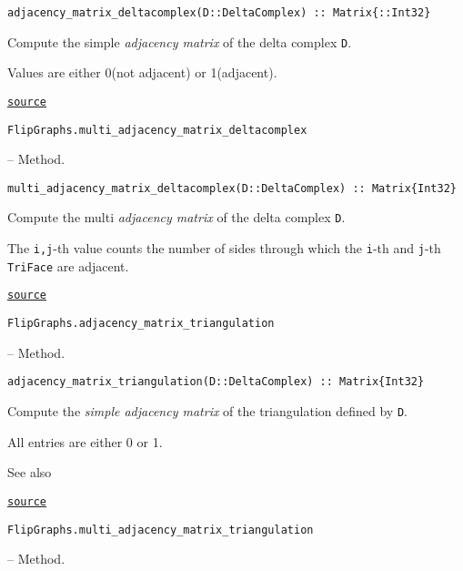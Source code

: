 \begin{adjustwidth}{2em}{0pt}


\begin{verbatim}
adjacency_matrix_deltacomplex(D::DeltaComplex) :: Matrix{::Int32}
\end{verbatim}

Compute the simple \emph{adjacency matrix} of the delta complex \texttt{D}.

Values are either 0(not adjacent) or 1(adjacent).



\href{https://github.com/schto223/FlipGraphs.jl/blob/e35d43698a06b86273148826b79d585ba04fcd26/src/deltaComplex.jl#L407-L413}{\texttt{source}}


\end{adjustwidth}
\hypertarget{3047080931709895726}{\texttt{FlipGraphs.multi\_adjacency\_matrix\_deltacomplex}}  -- {Method.}

\begin{adjustwidth}{2em}{0pt}


\begin{verbatim}
multi_adjacency_matrix_deltacomplex(D::DeltaComplex) :: Matrix{Int32}
\end{verbatim}

Compute the multi \emph{adjacency matrix} of the delta complex \texttt{D}.

The \texttt{i,j}-th value counts the number of sides through which the \texttt{i}-th and \texttt{j}-th \texttt{TriFace} are adjacent.



\href{https://github.com/schto223/FlipGraphs.jl/blob/e35d43698a06b86273148826b79d585ba04fcd26/src/deltaComplex.jl#L432-L438}{\texttt{source}}


\end{adjustwidth}
\hypertarget{10856297191220049265}{\texttt{FlipGraphs.adjacency\_matrix\_triangulation}}  -- {Method.}

\begin{adjustwidth}{2em}{0pt}


\begin{verbatim}
adjacency_matrix_triangulation(D::DeltaComplex) :: Matrix{Int32}
\end{verbatim}

Compute the \emph{simple adjacency matrix} of the triangulation defined by \texttt{D}.

All entries are either 0 or 1.

See also 



\href{https://github.com/schto223/FlipGraphs.jl/blob/e35d43698a06b86273148826b79d585ba04fcd26/src/deltaComplex.jl#L445-L453}{\texttt{source}}


\end{adjustwidth}
\hypertarget{9319800104016369462}{\texttt{FlipGraphs.multi\_adjacency\_matrix\_triangulation}}  -- {Method.}

